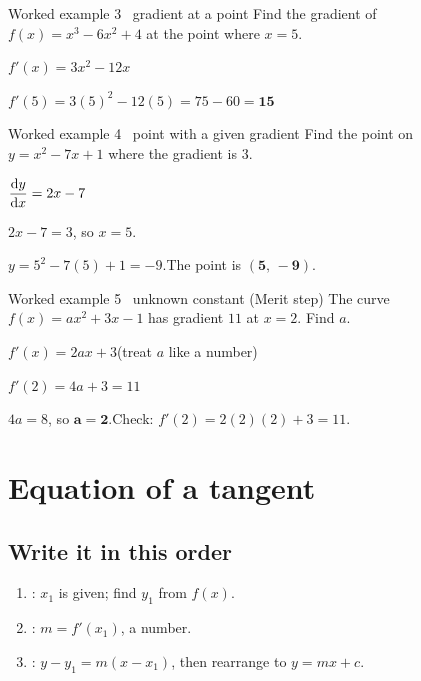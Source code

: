 \documentclass[11pt]{article}
\begin{document}
\begin{example}{Worked example 3 \textperiodcentered\ gradient at a point}
Find the gradient of $f(x)=x^{3}-6x^{2}+4$ at the point where $x=5$.
\begin{steps}
\item $f'(x)=3x^{2}-12x$
\item $f'(5)=3(5)^{2}-12(5)=75-60=\mathbf{15}$
\end{steps}
\end{example}

\begin{example}{Worked example 4 \textperiodcentered\ point with a given gradient}
Find the point on $y=x^{2}-7x+1$ where the gradient is $3$.
\begin{steps}
\item $\dfrac{\mathrm{d}y}{\mathrm{d}x}=2x-7$
\item $2x-7=3$, so $x=5$.
\item $y=5^{2}-7(5)+1=-9$.\quad The point is $\mathbf{(5,\,-9)}$.
\end{steps}
\end{example}

\begin{example}{Worked example 5 \textperiodcentered\ unknown constant (Merit step)}
The curve $f(x)=ax^{2}+3x-1$ has gradient $11$ at $x=2$. Find $a$.
\begin{steps}
\item $f'(x)=2ax+3$\quad (treat $a$ like a number)
\item $f'(2)=4a+3=11$
\item $4a=8$, so $\mathbf{a=2}$.\quad Check: $f'(2)=2(2)(2)+3=11$.
\end{steps}
\end{example}

\section{Equation of a tangent}\label{tangent}
\subsection{Write it in this order}
\begin{enumerate}[leftmargin=7mm, itemsep=1pt]
\item {}: $x_{1}$ is given; find $y_{1}$ from $f(x)$.
\item {}: $m=f'(x_{1})$, a number.
\item {}: $y-y_{1}=m(x-x_{1})$, then rearrange to $y=mx+c$.
\end{enumerate}
\end{document}
